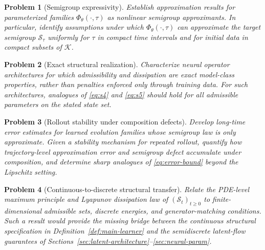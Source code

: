 \documentclass[11pt]{article}
\newtheorem{problem}{Problem}
\newcommand{\cS}{\mathcal{S}}
\newcommand{\cK}{\mathcal{K}}
\newcommand{\PhiT}{\Phi_{\theta}}
\begin{document}
\begin{problem}[Semigroup expressivity]
Establish approximation results for parameterized families \(\PhiT(\cdot,\tau)\) as nonlinear semigroup approximants. In particular, identify assumptions under which \(\PhiT(\cdot,\tau)\) can approximate the target semigroup \(\cS_{\tau}\) uniformly for \(\tau\) in compact time intervals and for initial data in compact subsets of \(\cK\).
\end{problem}

\begin{problem}[Exact structural realization]
Characterize neural operator architectures for which admissibility and dissipation are exact model-class properties, rather than penalties enforced only through training data. For such architectures, analogues of \eqref{eq:s4} and \eqref{eq:s5} should hold for all admissible parameters on the stated state set.
\end{problem}

\begin{problem}[Rollout stability under composition defects]
Develop long-time error estimates for learned evolution families whose semigroup law is only approximate. Given a stability mechanism for repeated rollout, quantify how trajectory-level approximation error and semigroup defect accumulate under composition, and determine sharp analogues of \eqref{eq:error-bound} beyond the Lipschitz setting.
\end{problem}

\begin{problem}[Continuous-to-discrete structural transfer]
Relate the PDE-level maximum principle and Lyapunov dissipation law of \((\cS_t)_{t\ge 0}\) to finite-dimensional admissible sets, discrete energies, and generator-matching conditions. Such a result would provide the missing bridge between the continuous structural specification in Definition~\ref{def:main-learner} and the semidiscrete latent-flow guarantees of Sections~\ref{sec:latent-architecture}--\ref{sec:neural-param}.
\end{problem}
\end{document}
